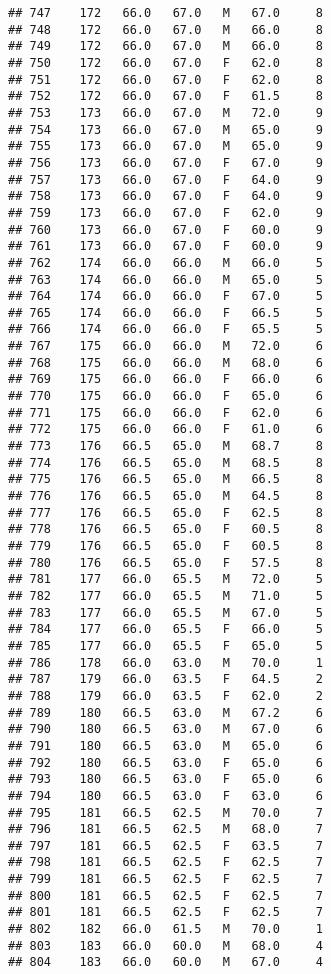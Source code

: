 \documentclass[
]{article}
\begin{document}
\begin{verbatim}
## 747    172   66.0   67.0   M   67.0     8
## 748    172   66.0   67.0   M   66.0     8
## 749    172   66.0   67.0   M   66.0     8
## 750    172   66.0   67.0   F   62.0     8
## 751    172   66.0   67.0   F   62.0     8
## 752    172   66.0   67.0   F   61.5     8
## 753    173   66.0   67.0   M   72.0     9
## 754    173   66.0   67.0   M   65.0     9
## 755    173   66.0   67.0   M   65.0     9
## 756    173   66.0   67.0   F   67.0     9
## 757    173   66.0   67.0   F   64.0     9
## 758    173   66.0   67.0   F   64.0     9
## 759    173   66.0   67.0   F   62.0     9
## 760    173   66.0   67.0   F   60.0     9
## 761    173   66.0   67.0   F   60.0     9
## 762    174   66.0   66.0   M   66.0     5
## 763    174   66.0   66.0   M   65.0     5
## 764    174   66.0   66.0   F   67.0     5
## 765    174   66.0   66.0   F   66.5     5
## 766    174   66.0   66.0   F   65.5     5
## 767    175   66.0   66.0   M   72.0     6
## 768    175   66.0   66.0   M   68.0     6
## 769    175   66.0   66.0   F   66.0     6
## 770    175   66.0   66.0   F   65.0     6
## 771    175   66.0   66.0   F   62.0     6
## 772    175   66.0   66.0   F   61.0     6
## 773    176   66.5   65.0   M   68.7     8
## 774    176   66.5   65.0   M   68.5     8
## 775    176   66.5   65.0   M   66.5     8
## 776    176   66.5   65.0   M   64.5     8
## 777    176   66.5   65.0   F   62.5     8
## 778    176   66.5   65.0   F   60.5     8
## 779    176   66.5   65.0   F   60.5     8
## 780    176   66.5   65.0   F   57.5     8
## 781    177   66.0   65.5   M   72.0     5
## 782    177   66.0   65.5   M   71.0     5
## 783    177   66.0   65.5   M   67.0     5
## 784    177   66.0   65.5   F   66.0     5
## 785    177   66.0   65.5   F   65.0     5
## 786    178   66.0   63.0   M   70.0     1
## 787    179   66.0   63.5   F   64.5     2
## 788    179   66.0   63.5   F   62.0     2
## 789    180   66.5   63.0   M   67.2     6
## 790    180   66.5   63.0   M   67.0     6
## 791    180   66.5   63.0   M   65.0     6
## 792    180   66.5   63.0   F   65.0     6
## 793    180   66.5   63.0   F   65.0     6
## 794    180   66.5   63.0   F   63.0     6
## 795    181   66.5   62.5   M   70.0     7
## 796    181   66.5   62.5   M   68.0     7
## 797    181   66.5   62.5   F   63.5     7
## 798    181   66.5   62.5   F   62.5     7
## 799    181   66.5   62.5   F   62.5     7
## 800    181   66.5   62.5   F   62.5     7
## 801    181   66.5   62.5   F   62.5     7
## 802    182   66.0   61.5   M   70.0     1
## 803    183   66.0   60.0   M   68.0     4
## 804    183   66.0   60.0   M   67.0     4

\end{verbatim}
\end{document}
